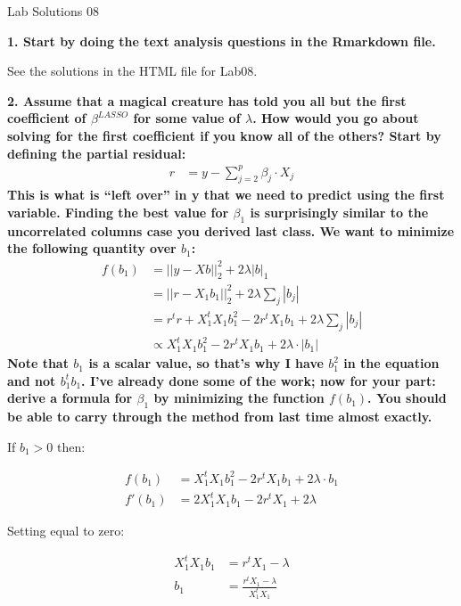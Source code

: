 \documentclass[12pt,hidelinks]{article}
\numberwithin{equation}{section}
\begin{document}
{\LARGE Lab Solutions 08}

\vspace*{12pt}

\textbf{1. Start by doing the text analysis questions in the Rmarkdown file.}

\vspace*{12pt}

See the solutions in the HTML file for Lab08.

\vspace*{12pt}

\textbf{2. Assume that a magical creature has told you all but the first
coefficient of $\beta^{LASSO}$ for some value of $\lambda$. How would you
go about solving for the first coefficient if you know all of the others?
Start by defining the partial residual:}
\begin{align}
r &= y - \sum_{j = 2}^p \beta_j \cdot X_j
\end{align}
\textbf{This is what is ``left over'' in y that we need to predict using the first
variable. Finding the best value for $\beta_1$ is surprisingly similar to the
uncorrelated columns case you derived last class. We want to minimize the
following quantity over $b_1$:}
\begin{align}
f(b_1) &= || y - X b ||_2^2 + 2 \lambda | b |_1 \\
&= || r - X_1 b_1 ||_2^2 + 2 \lambda \sum_j | b_j | \\
&= r^t r + X_1^t X_1 b_1^2 - 2 r^t X_1 b_1 + 2 \lambda \sum_j | b_j | \\
&\propto X_1^t X_1 b_1^2 - 2 r^t X_1 b_1 + 2 \lambda \cdot | b_1 |
\end{align}
\textbf{Note that $b_1$ is a scalar value, so that's why I have $b_1^2$ in the equation
and not $b_1^t b_1$. I've already done some of the work; now for your part:
derive a formula for $\beta_1$ by minimizing the function $f(b_1)$. You should
be able to carry through the method from last time almost exactly.}

\vspace*{12pt}

If $b_1 > 0$ then:

\begin{align}
f(b_1) &= X_1^t X_1 b_1^2 - 2 r^t X_1 b_1 + 2 \lambda \cdot b_1 \\
f'(b_1) &= 2 X_1^t X_1 b_1 - 2 r^t X_1 + 2 \lambda
\end{align}

Setting equal to zero:

\begin{align}
X_1^t X_1 b_1 &= r^t X_1 - \lambda \\
b_1 &= \frac{r^t X_1 - \lambda}{ X_1^t X_1}
\end{align}
\end{document}

